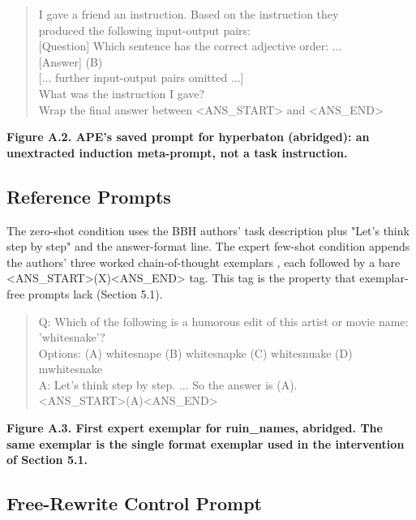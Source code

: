 \documentclass{ieeeaccess}
\begin{document}
\centering
\begin{quote}\ttfamily\small
I gave a friend an instruction. Based on the instruction they\\{}
produced the following input-output pairs:\\{}
[Question] Which sentence has the correct adjective order: ...\\{}
[Answer] (B)\\{}
[... further input-output pairs omitted ...]\\{}
What was the instruction I gave?\\{}
Wrap the final answer between <ANS\_\allowbreak{}START> and <ANS\_\allowbreak{}END>\\{}
\end{quote}
\par\noindent\textbf{Figure A.2. APE's saved prompt for hyperbaton (abridged): an unextracted induction meta-prompt, not a task instruction.}

\subsection{Reference Prompts}

The zero-shot condition uses the BBH authors' task description plus "Let's think step by step" and the answer-format line. The expert few-shot condition appends the authors' three worked chain-of-thought exemplars \cite{suzgun2023}, each followed by a bare <ANS\_\allowbreak{}START>(X)<ANS\_\allowbreak{}END> tag. This tag is the property that exemplar-free prompts lack (Section 5.1).

\centering
\begin{quote}\ttfamily\small
Q: Which of the following is a humorous edit of this artist or movie name: 'whitesnake'?\\{}
Options: (A) whitesnape (B) whitesnapke (C) whitesnuake (D) mwhitesnake\\{}
A: Let's think step by step. ... So the answer is (A).\\{}
<ANS\_\allowbreak{}START>(A)<ANS\_\allowbreak{}END>\\{}
\end{quote}
\par\noindent\textbf{Figure A.3. First expert exemplar for ruin\_\allowbreak{}names, abridged. The same exemplar is the single format exemplar used in the intervention of Section 5.1.}

\subsection{Free-Rewrite Control Prompt}
\end{document}
